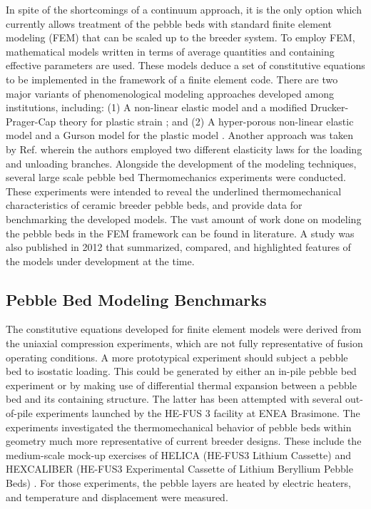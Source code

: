 In spite of the shortcomings of a continuum approach, it is the only option which currently allows treatment of the pebble beds with standard finite element modeling (FEM) that can be scaled up to the breeder system. To employ FEM, mathematical models written in terms of average quantities and containing effective parameters are used. These models deduce a set of constitutive equations to be implemented in the framework of a finite element code.  There are two major variants of phenomenological modeling approaches developed among institutions, including: (1) A non-linear elastic model and a modified Drucker-Prager-Cap theory for plastic strain \cite{Gan2007189,Fokkens2003}; and (2) A hyper-porous non-linear elastic model and a Gurson model for the plastic model \cite{DellOrco:2007hc,DellOrco:2010zr,DiMaio20081287}. Another approach was taken by Ref.\cite{Fokkens2003} wherein the authors employed two different elasticity laws for the loading and unloading branches. Alongside the development of the modeling techniques, several large scale pebble bed Thermomechanics experiments were conducted. These experiments were intended to reveal the underlined thermomechanical characteristics of ceramic breeder pebble beds, and provide data for benchmarking the developed models. The vast amount of work done on modeling the pebble beds in the FEM framework can be found in literature. \cite{DellOrco:2007hc,DellOrco:2010zr,DiMaio20101234,Gan:2009vn,Gan:2010lh,Gan:2010kc,Gan2007189} A study was also published in 2012 that summarized, compared, and highlighted features of the models under development at the time.\cite{ying2011isfnt}



\subsection{Pebble Bed Modeling Benchmarks}

The constitutive equations developed for finite element models were derived from the uniaxial compression experiments, which are not fully representative of fusion operating conditions. A more prototypical experiment should subject a pebble bed to isostatic loading. This could be generated by either an in-pile pebble bed experiment or by making use of differential thermal expansion between a pebble bed and its containing structure. The latter has been attempted with several out-of-pile experiments launched by the HE-FUS 3 facility at ENEA Brasimone. The experiments investigated the thermomechanical behavior of pebble beds within geometry much more representative of current breeder designs. These include the medium-scale mock-up exercises of HELICA (HE-FUS3 Lithium Cassette) and HEXCALIBER (HE-FUS3 Experimental Cassette of Lithium Beryllium Pebble Beds) \cite{dellorco:2006,DiMaio20081287}. For those experiments, the pebble layers are heated by electric heaters, and temperature and displacement were measured.

